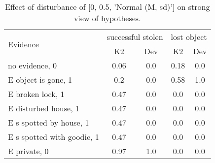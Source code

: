 \begin{table}\begin{tabular}{l|cc|cc}\toprule\multirow{2}{*}{Evidence} & \multicolumn{2}{c}{successful stolen}& \multicolumn{2}{c}{lost object}\\& {K2} & {Dev}& {K2} & {Dev}\\\midrule
no evidence, 0 & \cellcolor{Bittersweet}0.06&\cellcolor{Bittersweet}0.0&\cellcolor{Bittersweet}0.18&\cellcolor{Bittersweet}0.0\\E object is gone, 1 & \cellcolor{Bittersweet}0.2&\cellcolor{Bittersweet}0.0&0.58&1.0\\E broken lock, 1 & 0.47&0.0&\cellcolor{Bittersweet}0.0&\cellcolor{Bittersweet}0.0\\E disturbed house, 1 & 0.47&0.0&\cellcolor{Bittersweet}0.0&\cellcolor{Bittersweet}0.0\\E s spotted by house, 1 & 0.47&0.0&\cellcolor{Bittersweet}0.0&\cellcolor{Bittersweet}0.0\\E s spotted with goodie, 1 & 0.47&0.0&\cellcolor{Bittersweet}0.0&\cellcolor{Bittersweet}0.0\\E private, 0 & \cellcolor{Bittersweet}0.97&\cellcolor{Bittersweet}1.0&\cellcolor{Bittersweet}0.0&\cellcolor{Bittersweet}0.0\\\bottomrule\end{tabular}\caption{Effect of disturbance of [0, 0.5, 'Normal (M, sd)'] on strong view of hypotheses.}\end{table}
